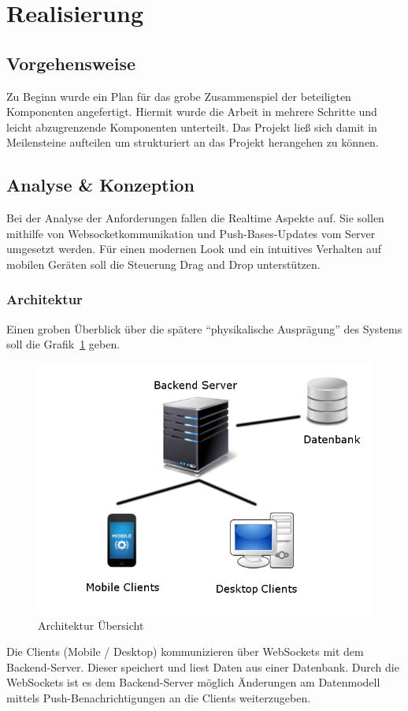 \section{Realisierung}
\subsection{Vorgehensweise}
Zu Beginn wurde ein Plan für das grobe Zusammenspiel der beteiligten Komponenten angefertigt. Hiermit wurde die Arbeit in mehrere Schritte und leicht abzugrenzende Komponenten unterteilt. Das Projekt ließ sich damit in Meilensteine aufteilen um strukturiert an das Projekt herangehen zu können.
\subsection{Analyse \& Konzeption}
Bei der Analyse der Anforderungen fallen die Realtime Aspekte auf. Sie sollen mithilfe von Websocketkommunikation und Push-Bases-Updates vom Server umgesetzt werden. Für einen modernen Look und ein intuitives Verhalten auf mobilen Geräten soll die Steuerung Drag and Drop unterstützen.
\subsubsection*{Architektur}
Einen groben Überblick über die spätere ``physikalische Ausprägung'' des Systems soll die Grafik~\ref{fig:architektur} geben.
\begin{figure}[h]
\includegraphics[scale=0.5]{img/Architektur.png}
\caption{Architektur Übersicht\label{fig:architektur}}
\end{figure}
Die Clients (Mobile / Desktop) kommunizieren über WebSockets mit dem Backend-Server. Dieser speichert und liest Daten aus einer Datenbank. Durch die WebSockets ist es dem Backend-Server möglich Änderungen am Datenmodell mittels Push-Benachrichtigungen an die Clients weiterzugeben.
